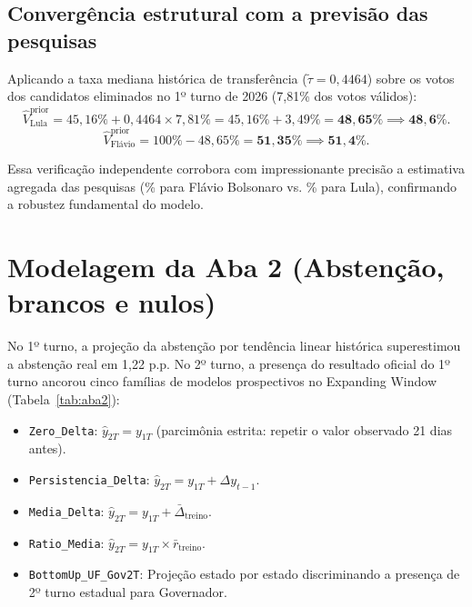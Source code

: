 \documentclass[10.5pt,a4paper]{article}
\begin{document}
\subsection{Convergência estrutural com a previsão das pesquisas}
Aplicando a taxa mediana histórica de transferência ($\tilde{\tau} = 0{,}4464$) sobre os votos dos candidatos eliminados no 1º turno de 2026 (7,81\% dos votos válidos):
\begin{equation}
\hat{V}_{\text{Lula}}^{\text{prior}} = 45{,}16\% + 0{,}4464 \times 7{,}81\% = 45{,}16\% + 3{,}49\% = \mathbf{48{,}65\%} \implies \mathbf{48{,}6\%}.
\end{equation}
\begin{equation}
\hat{V}_{\text{Flávio}}^{\text{prior}} = 100\% - 48{,}65\% = \mathbf{51{,}35\%} \implies \mathbf{51{,}4\%}.
\end{equation}

Essa verificação independente corrobora com impressionante precisão a estimativa agregada das pesquisas (\pFlavio\% para Flávio Bolsonaro vs. \pLula\% para Lula), confirmando a robustez fundamental do modelo.

\section{Modelagem da Aba 2 (Abstenção, brancos e nulos)}

No 1º turno, a projeção da abstenção por tendência linear histórica superestimou a abstenção real em 1,22 p.p. No 2º turno, a presença do resultado oficial do 1º turno ancorou cinco famílias de modelos prospectivos no Expanding Window (Tabela~\ref{tab:aba2}):
\begin{itemize}
    \item \texttt{Zero\_Delta}: $\hat{y}_{2T} = y_{1T}$ (parcimônia estrita: repetir o valor observado 21 dias antes).
    \item \texttt{Persistencia\_Delta}: $\hat{y}_{2T} = y_{1T} + \Delta y_{t-1}$.
    \item \texttt{Media\_Delta}: $\hat{y}_{2T} = y_{1T} + \bar{\Delta}_{\text{treino}}$.
    \item \texttt{Ratio\_Media}: $\hat{y}_{2T} = y_{1T} \times \bar{r}_{\text{treino}}$.
    \item \texttt{BottomUp\_UF\_Gov2T}: Projeção estado por estado discriminando a presença de 2º turno estadual para Governador.
\end{itemize}

\begin{table}[h]
\centering\small
\caption{Backtest da Aba 2 no Expanding Window (2014, 2018, 2022) e previsão final.}
\label{tab:aba2}

\end{table}
\end{document}
